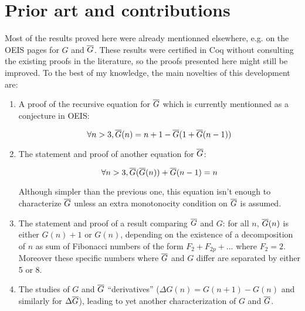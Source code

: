 \documentclass[a4paper,11pt]{article}
\begin{document}
\section{Prior art and contributions}
Most of the results proved here were already mentionned elsewhere,
e.g. on the OEIS pages for $G$ and $\overline{G}$. These results were certified
in Coq without consulting the existing proofs in the literature, so
the proofs presented here might still be improved. To the best of
my knowledge, the main novelties of this development are:
\begin{enumerate}
\item
  A proof of the recursive
equation for $\overline{G}$ which is currently mentionned as a conjecture in OEIS:

$$\forall n>3, \overline{G}(n) = n+1 - \overline{G}(1+\overline{G}(n-1))$$

\item
  The statement and proof of another equation for $\overline{G}$:

$$\forall n>3, \overline{G}(\overline{G}(n)) + \overline{G}(n-1) = n$$

Although simpler than the previous one, this equation isn't
enough to characterize $\overline{G}$ unless an extra monotonocity
condition on $\overline{G}$ is assumed.

\item
  The statement and proof of a result comparing $\overline{G}$ and $G$:
for all $n$, $\overline{G}(n)$ is either $G(n)+1$ or $G(n)$, depending
on the existence of a decomposition of $n$ as sum of Fibonacci numbers
of the form $F_2 + F_{2p} + ...$ where $F_2 = 2$. Moreover these
specific numbers where $\overline{G}$ and $G$ differ are separated by either
5 or 8.

\item The studies of $G$ and $\overline{G}$ ``derivatives''
  ($\Delta G(n) = G(n+1)-G(n)$ and similarly for $\Delta\overline{G}$),
  leading to yet another characterization of $G$ and $\overline{G}$.

\end{enumerate}
\end{document}
